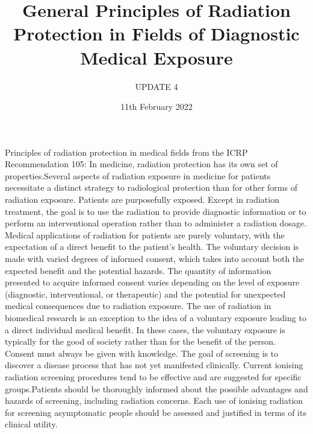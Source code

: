 \documentclass[12pt]{article}
\title{ General Principles of Radiation Protection in Fields of Diagnostic Medical Exposure}
\author{UPDATE 4}
\date{11th February 2022}
\begin{document}
\maketitle

Principles of radiation protection in medical fields from the ICRP Recommendation 105: In medicine, radiation protection has its own set of properties.Several aspects of radiation exposure in medicine for patients necessitate a distinct strategy to radiological protection than for other forms of radiation exposure. Patients are purposefully exposed. Except in radiation treatment, the goal is to use the radiation to provide diagnostic information or to perform an interventional operation rather than to administer a radiation dosage. Medical applications of radiation for patients are purely voluntary, with the expectation of a direct benefit to the patient's health. The voluntary decision is made with varied degrees of informed consent, which takes into account both the expected benefit and the potential hazards. The quantity of information presented to acquire informed consent varies depending on the level of exposure (diagnostic, interventional, or therapeutic) and the potential for unexpected medical consequences due to radiation exposure. The use of radiation in biomedical research is an exception to the idea of a voluntary exposure leading to a direct individual medical benefit. In these cases, the voluntary exposure is typically for the good of society rather than for the benefit of the person. Consent must always be given with knowledge. The goal of screening is to discover a disease process that has not yet manifested clinically. Current ionising radiation screening procedures tend to be effective and are suggested for specific groups.Patients should be thoroughly informed about the possible advantages and hazards of screening, including radiation concerns. Each use of ionising radiation for screening asymptomatic people should be assessed and justified in terms of its clinical utility.
\end{document}
